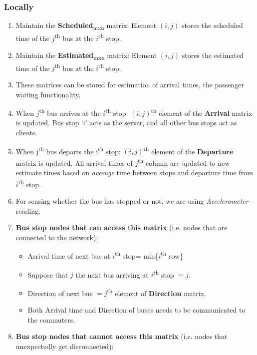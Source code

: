 \subsubsection{Locally}

\begin{enumerate}

    \item Maintain the \textbf{Scheduled}\textsubscript{mxn} matrix: Element $(i, j)$ stores the scheduled time of the $j$\textsuperscript{th} bus at the $i$\textsuperscript{th} stop.
    \item Maintain the \textbf{Estimated}\textsubscript{mxn} matrix: Element $(i, j)$ stores the estimated time of the $j$\textsuperscript{th} bus at the $i$\textsuperscript{th} stop.
    \item These matrices can be stored for estimation of arrival times, the passenger waiting functionality.
    \item When $j$\textsuperscript{th} bus arrives at the $i$\textsuperscript{th} stop: $(i, j)$\textsuperscript{th} element of the \textbf{Arrival} matrix is updated. Bus stop `i' acts as the server, and all other bus stops act as clients.
    \item When j\textsuperscript{th} bus departs the i\textsuperscript{th} stop: $(i, j)$\textsuperscript{th} element of the \textbf{Departure} matrix is updated. All arrival times of $j$\textsuperscript{th} column are updated to new estimate times based on \textit{average} time between stops and departure time from $i$\textsuperscript{th} stop.
    \item For sensing whether the bus has stopped or not, we are using \textit{Accelerometer} reading.
    \item \textbf{Bus stop nodes that can access this matrix} (i.e. nodes that are connected to the network):
          \begin{itemize}
              \item Arrival time of next bus at $i$\textsuperscript{th} stop= min\{$i$\textsuperscript{th} row\}
              \item Suppose that $j$ the next bus arriving at $i$\textsuperscript{th} stop $= j$.
              \item Direction of next bus $= j$\textsuperscript{th} element of \textbf{Direction} matrix.
              \item Both Arrival time and Direction of buses needs to be communicated to the commuters.
          \end{itemize}
    \item \textbf{Bus stop nodes that cannot access this matrix} (i.e. nodes that unexpectedly get disconnected):

\end{enumerate}
